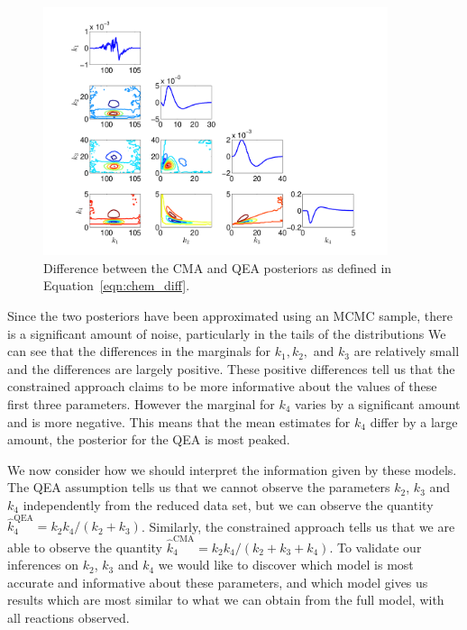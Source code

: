 \documentclass[final]{siamltex}
\begin{document}
\begin{figure}[htb]
\centering
\includegraphics[width=0.9\textwidth]{"images/Applications/Diff_CMA_QEA"}
\caption{Difference between the CMA and QEA posteriors as defined in Equation~\eqref{eqn:chem_diff}.}
\label{fig:chem_diff}
\end{figure}

Since the two posteriors have been approximated using an MCMC sample, there is a significant amount of noise, particularly in the tails of the distributions We can see that the differences in the marginals for $k_1, k_2,$ and $k_3$ are relatively small and the differences are largely positive. These positive differences tell us that the constrained approach claims to be more informative about the values of these first three parameters. However the marginal for $k_4$ varies by a significant amount and is more negative. This means that the mean estimates for $k_4$ differ by a large amount, the posterior for the QEA is most peaked.

We now consider how we should interpret the information given by these models. The QEA assumption tells us that we cannot observe the parameters $k_2$, $k_3$ and $k_4$ independently from the reduced data set, but we can observe the quantity $\hat{k}_4^{\text{QEA}} = k_2k_4/(k_2+k_3)$. Similarly, the constrained approach tells us that we are able to observe the quantity $\hat{k}_4^{\text{CMA}} = k_2k_4/(k_2+k_3+k_4)$. To validate our inferences on $k_2$, $k_3$ and $k_4$ we would like to discover which model is most accurate and informative about these parameters, and which model gives us results which are most similar to what we can obtain from the full model, with all reactions observed.
\end{document}
